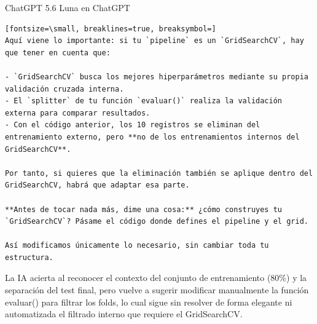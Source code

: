 \documentclass[12pt,a4paper,oneside]{book}
\begin{document}
\begin{iaresp}{ChatGPT 5.6 Luna en ChatGPT}
\begin{Verbatim}[fontsize=\small, breaklines=true, breaksymbol=]
Aquí viene lo importante: si tu `pipeline` es un `GridSearchCV`, hay que tener en cuenta que:

- `GridSearchCV` busca los mejores hiperparámetros mediante su propia validación cruzada interna.
- El `splitter` de tu función `evaluar()` realiza la validación externa para comparar resultados.
- Con el código anterior, los 10 registros se eliminan del entrenamiento externo, pero **no de los entrenamientos internos del GridSearchCV**.

Por tanto, si quieres que la eliminación también se aplique dentro del GridSearchCV, habrá que adaptar esa parte.

**Antes de tocar nada más, dime una cosa:** ¿cómo construyes tu `GridSearchCV`? Pásame el código donde defines el pipeline y el grid.

Así modificamos únicamente lo necesario, sin cambiar toda tu estructura.
\end{Verbatim}
\end{iaresp}
\begin{iaanalisis}
La IA acierta al reconocer el contexto del conjunto de entrenamiento (80\%) y la separación del test final, pero vuelve a sugerir modificar manualmente la función evaluar() para filtrar los folds, lo cual sigue sin resolver de forma elegante ni automatizada el filtrado interno que requiere el GridSearchCV.
\end{iaanalisis}
\end{document}
